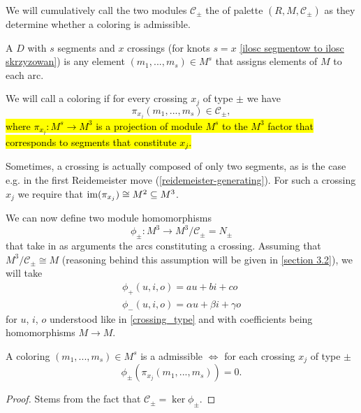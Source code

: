 We will cumulatively call the two modules $\mathcal{C}_\pm$ the  of palette $(R, M, \mathcal{C}_\pm)$ as they determine whether a coloring is admissible.

\begin{definition}
  A  $D$ with $s$ segments and $x$ crossings (for knots $s=x$ \cref{ilosc segmentow to ilosc skrzyzowan}) is any element $(m_1,..., m_s)\in M^s$ that assigns elements of $M$ to each arc. 

  We will call a coloring  if for every crossing $x_j$ of type $\pm$ we have 
  $$\pi_{x_j}(m_1,..., m_s)\in \mathcal{C}_\pm,$$
\hl{where $\pi_{x_j}:M^s\to M^3$ is a projection of module $M^s$ to the $M^3$ factor that corresponds to segments that constitute $x_j$.} 
\end{definition}

Sometimes, a crossing is actually composed of only two segments, as is the case e.g. in the first Reidemeister move (\cref{reidemeister-generating}). For such a crossing $x_j$ we require that $\operatorname{im}(\pi_{x_j})\cong M^2\subseteq M^3$.


We can now define two module homomorphisms
$$\phi_\pm:M^3\to M^3/\mathcal{C}_\pm=N_\pm$$
that take in as arguments the arcs constituting a crossing. Assuming that $M^3/\mathcal{C}_\pm\cong M$ (reasoning behind this assumption will be given in \cref{section 3.2}), we will take 
\begin{align}
  \phi_+(u,i,o)=au+bi+co \label{phi equations1} \\ 
  \phi_-(u,i,o)=\alpha u+\beta i+\gamma o \label{phi equations2}
\end{align}
for $u$, $i$, $o$ understood like in \cref{crossing_type} and with coefficients being homomorphisms $M\to M$.

\begin{lemma}\label{proposition male kernel kolorowania}
  A coloring $(m_1,..., m_s)\in M^s$ is a admissible $\iff$ for each crossing $x_j$ of type $\pm$ 
  $$\phi_\pm(\pi_{x_j}(m_1,...,m_s))=0.$$
\end{lemma}

\begin{proof}
  Stems from the fact that $\mathcal{C}_\pm=\ker\phi_\pm$.
\end{proof}

